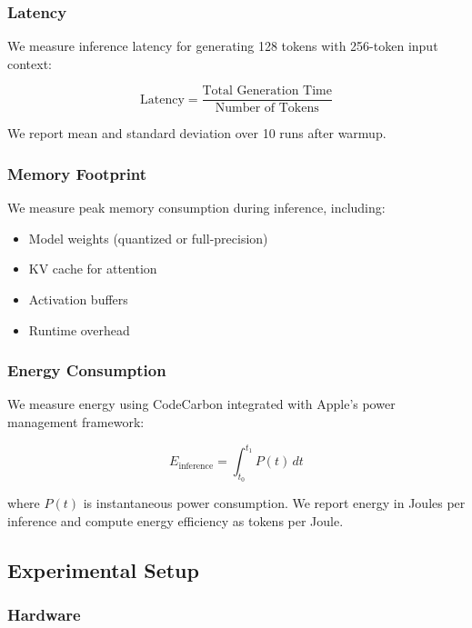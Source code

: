 \documentclass[conference]{IEEEtran}
\begin{document}
\subsubsection{Latency}

We measure inference latency for generating 128 tokens with 256-token input context:

\begin{equation}
\text{Latency} = \frac{\text{Total Generation Time}}{\text{Number of Tokens}}
\end{equation}

We report mean and standard deviation over 10 runs after warmup.

\subsubsection{Memory Footprint}

We measure peak memory consumption during inference, including:

\begin{itemize}[leftmargin=*,nosep]
    \item Model weights (quantized or full-precision)
    \item KV cache for attention
    \item Activation buffers
    \item Runtime overhead
\end{itemize}

\subsubsection{Energy Consumption}

We measure energy using CodeCarbon \cite{codecarbon2023} integrated with Apple's power management framework:

\begin{equation}
E_{\text{inference}} = \int_{t_0}^{t_1} P(t) \, dt
\end{equation}

where $P(t)$ is instantaneous power consumption. We report energy in Joules per inference and compute energy efficiency as tokens per Joule.

\subsection{Experimental Setup}

\subsubsection{Hardware}
\label{sec:hw-setup}
\end{document}

